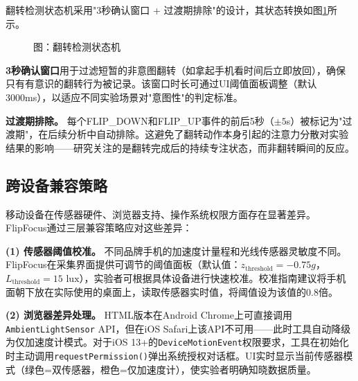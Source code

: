 \documentclass[12pt,a4paper]{ctexart}
\begin{document}
翻转检测状态机采用"3秒确认窗口 + 过渡期排除"的设计，其状态转换如图\ref{fig:state_machine}所示。

\begin{figure}[H]
\centering
{}
\caption*{图：翻转检测状态机}
\label{fig:state_machine}
\end{figure}

\textbf{3秒确认窗口}用于过滤短暂的非意图翻转（如拿起手机看时间后立即放回），确保只有有意识的翻转行为被记录。该窗口时长可通过UI阈值面板调整（默认3000ms），以适应不同实验场景对"意图性"的判定标准。

\textbf{过渡期排除。} 每个FLIP\_DOWN和FLIP\_UP事件的前后5秒（$\pm 5$s）被标记为"过渡期"，在后续分析中自动排除。这避免了翻转动作本身引起的注意力分散对实验结果的影响——研究关注的是翻转完成后的持续专注状态，而非翻转瞬间的反应。

\subsection{跨设备兼容策略}

移动设备在传感器硬件、浏览器支持、操作系统权限方面存在显著差异。FlipFocus通过三层兼容策略应对这些差异：

\textbf{(1) 传感器阈值校准。} 不同品牌手机的加速度计量程和光线传感器灵敏度不同。FlipFocus在采集界面提供可调节的阈值面板（默认值：$z_{\text{threshold}}=-0.75g$，$L_{\text{threshold}}=15\text{ lux}$），实验者可根据具体设备进行快速校准。校准指南建议将手机面朝下放在实际使用的桌面上，读取传感器实时值，将阈值设为该值的$0.8$倍。

\textbf{(2) 浏览器差异处理。} HTML版本在Android Chrome上可直接调用\texttt{AmbientLightSensor} API，但在iOS Safari上该API不可用——此时工具自动降级为仅加速度计模式。对于iOS 13+的\texttt{DeviceMotionEvent}权限要求，工具在初始化时主动调用\texttt{requestPermission()}弹出系统授权对话框。UI实时显示当前传感器模式（绿色=双传感器，橙色=仅加速度计），使实验者明确知晓数据质量。
\end{document}
